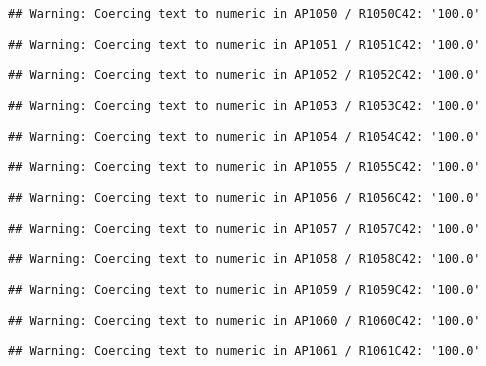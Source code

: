 \documentclass[
]{article}
\begin{document}
\begin{verbatim}
## Warning: Coercing text to numeric in AP1050 / R1050C42: '100.0'
\end{verbatim}

\begin{verbatim}
## Warning: Coercing text to numeric in AP1051 / R1051C42: '100.0'
\end{verbatim}

\begin{verbatim}
## Warning: Coercing text to numeric in AP1052 / R1052C42: '100.0'
\end{verbatim}

\begin{verbatim}
## Warning: Coercing text to numeric in AP1053 / R1053C42: '100.0'
\end{verbatim}

\begin{verbatim}
## Warning: Coercing text to numeric in AP1054 / R1054C42: '100.0'
\end{verbatim}

\begin{verbatim}
## Warning: Coercing text to numeric in AP1055 / R1055C42: '100.0'
\end{verbatim}

\begin{verbatim}
## Warning: Coercing text to numeric in AP1056 / R1056C42: '100.0'
\end{verbatim}

\begin{verbatim}
## Warning: Coercing text to numeric in AP1057 / R1057C42: '100.0'
\end{verbatim}

\begin{verbatim}
## Warning: Coercing text to numeric in AP1058 / R1058C42: '100.0'
\end{verbatim}

\begin{verbatim}
## Warning: Coercing text to numeric in AP1059 / R1059C42: '100.0'
\end{verbatim}

\begin{verbatim}
## Warning: Coercing text to numeric in AP1060 / R1060C42: '100.0'
\end{verbatim}

\begin{verbatim}
## Warning: Coercing text to numeric in AP1061 / R1061C42: '100.0'
\end{verbatim}
\end{document}
